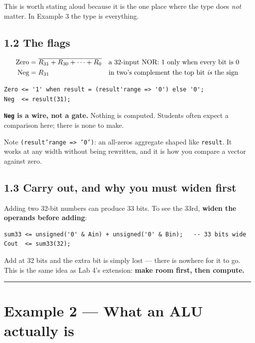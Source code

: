 \documentclass[11pt]{article}
\newcommand{\code}[1]{\texttt{#1}}
\newcommand{\hr}{\vspace{2pt}\hrule\vspace{6pt}}
\begin{document}
This is worth stating aloud because it is the one place where the type does
\emph{not} matter. In Example 3 the type is everything.

\subsection*{1.2 The flags}

\begin{align*}
\text{Zero} &= \overline{R_{31} + R_{30} + \cdots + R_0} && \text{a 32-input NOR: 1 only when every bit is 0}\\
\text{Neg}  &= R_{31} && \text{in two's complement the top bit \emph{is} the sign}
\end{align*}

\begin{lstlisting}
Zero <= '1' when result = (result'range => '0') else '0';
Neg  <= result(31);
\end{lstlisting}

\textbf{\code{Neg} is a wire, not a gate.} Nothing is computed. Students often
expect a comparison here; there is none to make.

Note \code{(result'range => '0')}: an all-zeros aggregate shaped like
\code{result}. It works at any width without being rewritten, and it is how you
compare a vector against zero.

\subsection*{1.3 Carry out, and why you must widen first}

Adding two 32-bit numbers can produce 33 bits. To see the 33rd, \textbf{widen the
operands before adding}:

\begin{lstlisting}
sum33 <= unsigned('0' & Ain) + unsigned('0' & Bin);   -- 33 bits wide
Cout  <= sum33(32);
\end{lstlisting}

Add at 32 bits and the extra bit is simply lost --- there is nowhere for it to go.
This is the same idea as Lab 4's extension: \textbf{make room first, then
compute.}

\vspace{4pt}\hr

\section*{Example 2 --- What an ALU actually is}
\end{document}
